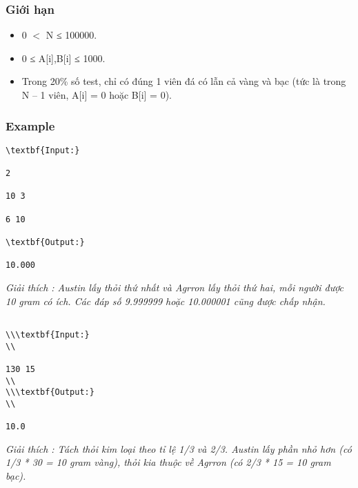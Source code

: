 \subsubsection{   Giới hạn  }
\begin{itemize}
	\item     0 $<$ N ≤ 100000.   
	\item     0 ≤ A[i],B[i] ≤ 1000.   
	\item     Trong 20\% số test, chỉ có đúng 1 viên đá có lẫn cả vàng và bạc (tức là trong N – 1 viên, A[i] = 0 hoặc B[i] = 0).   
\end{itemize}

\subsubsection{   Example  }
\begin{verbatim}
\textbf{Input:}

2

10 3

6 10

\textbf{Output:}

10.000\end{verbatim}

\emph{     Giải thích        : Austin lấy thỏi thứ nhất và Agrron lấy thỏi thứ hai, mỗi người được 10 gram có ích. Các đáp số 9.999999 hoặc 10.000001 cũng được chấp nhận.   }
\begin{verbatim}

\\\textbf{Input:}
\\

130 15
\\
\\\textbf{Output:}
\\

10.0\end{verbatim}

\emph{     Giải thích        : Tách thỏi kim loại theo tỉ lệ 1/3 và 2/3. Austin lấy phần nhỏ hơn (có 1/3 * 30 = 10 gram vàng), thỏi kia thuộc về Agrron (có 2/3 * 15 = 10 gram bạc).   }